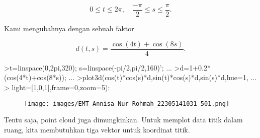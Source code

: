 \documentclass[a4paper,10pt]{article}
\begin{document}
\begin{eulernotebook}
\begin{eulercomment}
\end{eulercomment}
\begin{eulerformula}
\[
0 \le t \le 2\pi, \quad \frac{-\pi}{2} \le s \le \frac{\pi}{2}.
\]
\end{eulerformula}
\begin{eulercomment}
Kami mengubahnya dengan sebuah faktor

\end{eulercomment}
\begin{eulerformula}
\[
d(t,s) = \frac{\cos(4t)+\cos(8s)}{4}.
\]
\end{eulerformula}
\begin{eulerprompt}
>t=linspace(0,2pi,320); s=linspace(-pi/2,pi/2,160)'; ...
>d=1+0.2*(cos(4*t)+cos(8*s)); ...
>plot3d(cos(t)*cos(s)*d,sin(t)*cos(s)*d,sin(s)*d,hue=1, ...
>  light=[1,0,1],frame=0,zoom=5):
\end{eulerprompt}
\begin{figure}[h]
    \centering
    \texttt{[image: images/EMT\_Annisa Nur Rohmah\_22305141031-501.png]}
\end{figure}
\begin{eulercomment}
Tentu saja, point cloud juga dimungkinkan. Untuk memplot data titik
dalam ruang, kita membutuhkan tiga vektor untuk koordinat titik.


\end{eulercomment}
\end{eulernotebook}
\end{document}
